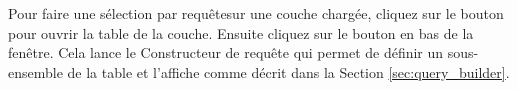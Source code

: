 Pour faire une \og sélection par requête\fg sur une couche chargée, cliquez sur le bouton\\  pour ouvrir la table de la couche. Ensuite cliquez sur le bouton  en bas de la fenêtre. Cela lance le Constructeur de requête qui permet de définir un sous-ensemble de la table et l'affiche comme décrit dans la Section \ref{sec:query_builder}.



